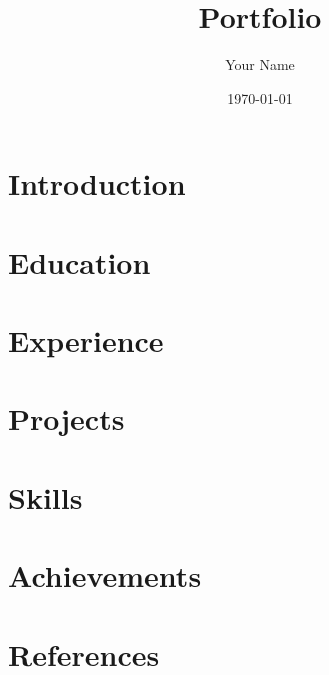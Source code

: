\documentclass{article}
\title{Portfolio}
\author{Your Name}
\date{\today}
\begin{document}
\maketitle

\section{Introduction}

\section{Education}

\section{Experience}

\section{Projects}

\section{Skills}

\section{Achievements}

\section{References}
\end{document}
